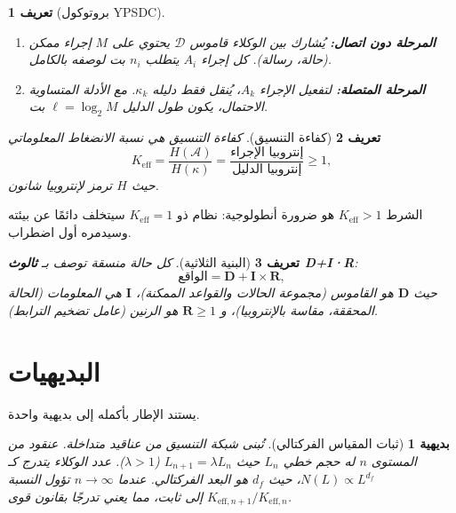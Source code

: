 \documentclass[11pt,a4paper]{article}
\newtheorem{axiom}{بديهية}
\newtheorem{definition}{تعريف}
\newcommand{\Keff}{K_{\mathrm{eff}}}
\begin{document}
	\begin{definition}[بروتوكول YPSDC]
		\begin{enumerate}[label=(\roman*)]
			\item \textbf{المرحلة دون اتصال:} يُشارك بين الوكلاء قاموس \(\mathcal{D}\) يحتوي على \(M\) إجراء ممكن (حالة، رسالة). كل إجراء \(A_i\) يتطلب \(n_i\) بت لوصفه بالكامل.
			\item \textbf{المرحلة المتصلة:} لتفعيل الإجراء \(A_k\)، يُنقل فقط دليله \(\kappa_k\). مع الأدلة المتساوية الاحتمال، يكون طول الدليل \(\ell = \log_2 M\) بت.
		\end{enumerate}
	\end{definition}
	
	\begin{definition}[كفاءة التنسيق]
		كفاءة التنسيق هي نسبة الانضغاط المعلوماتي
		\begin{equation}
			\Keff = \frac{H(\mathcal{A})}{H(\kappa)} = \frac{\text{إنتروبيا الإجراء}}{\text{إنتروبيا الدليل}} \ge 1,
			\label{eq:keff}
		\end{equation}
		حيث \(H\) ترمز لإنتروبيا شانون.
	\end{definition}
	
	الشرط \(K_{\mathrm{eff}} > 1\) هو ضرورة أنطولوجية: نظام ذو \(K_{\mathrm{eff}} = 1\) سيتخلف دائمًا عن بيئته وسيدمره أول اضطراب.
	
	\begin{definition}[البنية الثلاثية]
		كل حالة منسقة توصف بـ \textbf{ثالوث D+I·R}:
		\[
		\text{الواقع} = \mathbf{D} + \mathbf{I} \times \mathbf{R},
		\]
		حيث \(\mathbf{D}\) هو القاموس (مجموعة الحالات والقواعد الممكنة)، \(\mathbf{I}\) هي المعلومات (الحالة المحققة، مقاسة بالإنتروبيا)، و \(\mathbf{R} \ge 1\) هو الرنين (عامل تضخيم الترابط).
	\end{definition}
	
	\section{البديهيات}
	\label{sec:axioms}
	
	يستند الإطار بأكمله إلى بديهية واحدة.
	
	\begin{axiom}[ثبات المقياس الفركتالي]
		\label{ax:A1}
		تُبنى شبكة التنسيق من عناقيد متداخلة. عنقود من المستوى \(n\) له حجم خطي \(L_n\) حيث \(L_{n+1} = \lambda L_n\) (\(\lambda > 1\)). عدد الوكلاء يتدرج كـ \(N(L) \propto L^{d_f}\)، حيث \(d_f\) هو البعد الفركتالي. عندما \(n \to \infty\) تؤول النسبة \(K_{\mathrm{eff},n+1}/K_{\mathrm{eff},n}\) إلى ثابت، مما يعني تدرجًا بقانون قوى.
	\end{axiom}
	
\end{document}
